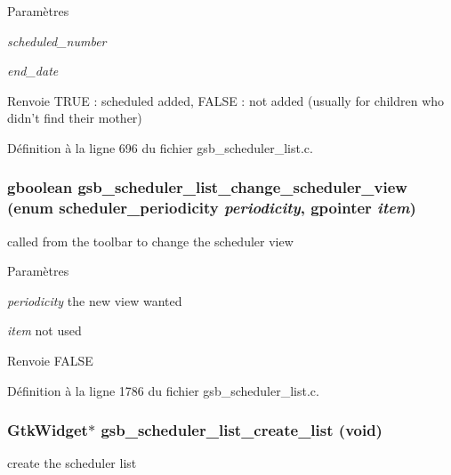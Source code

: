 \begin{DoxyParams}{Paramètres}
\item[{\em scheduled\_\-number}]\item[{\em end\_\-date}]\end{DoxyParams}
\begin{DoxyReturn}{Renvoie}
TRUE : scheduled added, FALSE : not added (usually for children who didn't find their mother) 
\end{DoxyReturn}


Définition à la ligne 696 du fichier gsb\_\-scheduler\_\-list.c.

\subsubsection[{gsb\_\-scheduler\_\-list\_\-change\_\-scheduler\_\-view}]{\setlength{\rightskip}{0pt plus 5cm}gboolean gsb\_\-scheduler\_\-list\_\-change\_\-scheduler\_\-view (enum {\bf scheduler\_\-periodicity} {\em periodicity}, \/  gpointer {\em item})}\label{gsb__scheduler__list_8h_a56cddba54e3383ebe1506b9a94e22a26}
called from the toolbar to change the scheduler view


\begin{DoxyParams}{Paramètres}
\item[{\em periodicity}]the new view wanted \item[{\em item}]not used\end{DoxyParams}
\begin{DoxyReturn}{Renvoie}
FALSE 
\end{DoxyReturn}


Définition à la ligne 1786 du fichier gsb\_\-scheduler\_\-list.c.

\subsubsection[{gsb\_\-scheduler\_\-list\_\-create\_\-list}]{\setlength{\rightskip}{0pt plus 5cm}GtkWidget$\ast$ gsb\_\-scheduler\_\-list\_\-create\_\-list (void)}\label{gsb__scheduler__list_8h_a12e2a6349e0cdbd81b349b588f137336}
create the scheduler list


